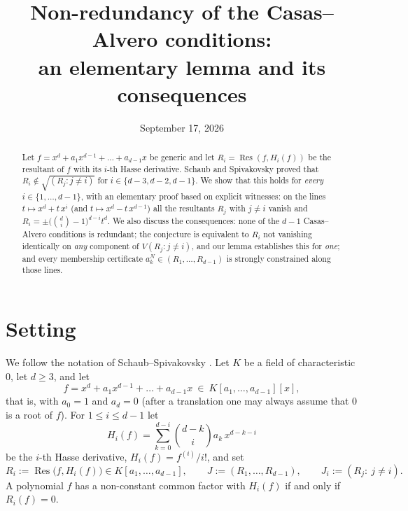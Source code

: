 \documentclass[11pt,reqno]{amsart}
\title[Non-redundancy of the Casas--Alvero conditions]
      {Non-redundancy of the Casas--Alvero conditions:\\
       an elementary lemma and its consequences}
\author{}
\date{September 17, 2026}
\theoremstyle{plain}
\theoremstyle{definition}
\DeclareMathOperator{\Res}{Res}
\begin{document}
\begin{abstract}
Let $f=x^d+a_1x^{d-1}+\dots+a_{d-1}x$ be generic and let
$R_i=\Res(f,H_i(f))$ be the resultant of $f$ with its $i$-th Hasse derivative.
Schaub and Spivakovsky proved that $R_i\notin\sqrt{(R_j:j\neq i)}$ for
$i\in\{d-3,d-2,d-1\}$. We show that this holds for \emph{every}
$i\in\{1,\dots,d-1\}$, with an elementary proof based on explicit witnesses: on
the lines $t\mapsto x^d+t\,x^i$ (and $t\mapsto x^d-t\,x^{d-1}$) all the
resultants $R_j$ with $j\neq i$ vanish and
$R_i=\pm\big(\binom{d}{i}-1\big)^{d-i}t^d$. We also discuss the consequences:
none of the $d-1$ Casas--Alvero conditions is redundant; the conjecture is
equivalent to $R_i$ not vanishing identically on \emph{any} component of
$V(R_j:j\neq i)$, and our lemma establishes this for \emph{one}; and every
membership certificate $a_k^N\in(R_1,\dots,R_{d-1})$ is strongly constrained
along those lines.
\end{abstract}

\maketitle

\begin{center}\small
{}
\end{center}

\section{Setting}

We follow the notation of Schaub--Spivakovsky \cite{SS}. Let $K$ be a field of
characteristic $0$, let $d\ge3$, and let
\[
  f=x^d+a_1x^{d-1}+\dots+a_{d-1}x\ \in\ K[a_1,\dots,a_{d-1}][x],
\]
that is, with $a_0=1$ and $a_d=0$ (after a translation one may always assume that
$0$ is a root of $f$). For $1\le i\le d-1$ let
\[
  H_i(f)=\sum_{k=0}^{d-i}\binom{d-k}{i}a_k\,x^{d-k-i}
\]
be the $i$-th Hasse derivative, $H_i(f)=f^{(i)}/i!$, and set
\[
  R_i:=\Res\big(f,H_i(f)\big)\in K[a_1,\dots,a_{d-1}],\qquad
  J:=(R_1,\dots,R_{d-1}),\qquad J_i:=(R_j:\ j\neq i).
\]
A polynomial $f$ has a non-constant common factor with $H_i(f)$ if and only if
$R_i(f)=0$.
\end{document}
